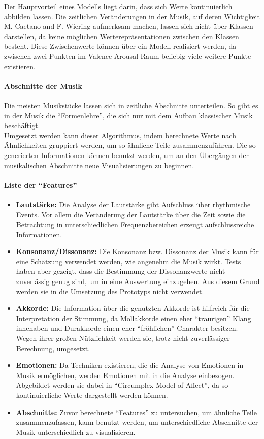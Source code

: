 \documentclass[11pt,a4paper]{article}
\begin{document}
Der Hauptvorteil eines Modells liegt darin, dass sich Werte kontinuierlich abbilden lassen. Die zeitlichen Veränderungen in der Musik, auf deren Wichtigkeit M. Caetano and F. Wiering
 \cite{8a02f9c512933d46fbea928d23ac65e38b61b88caba9b38319a5d4952b5a6667} aufmerksam machen, lassen sich nicht über Klassen darstellen, da keine möglichen Werterepräsentationen zwischen den Klassen besteht. Diese Zwischenwerte können über ein Modell realisiert werden, da zwischen zwei Punkten im Valence-Arousal-Raum beliebig viele weitere Punkte existieren.
 
\paragraph{Abschnitte der Musik}
Die meisten Musikstücke lassen sich in zeitliche Abschnitte unterteilen. So gibt es in der Musik die ``Formenlehre'', die sich nur mit dem Aufbau klassischer Musik beschäftigt.\\
Umgesetzt werden kann dieser Algorithmus, indem berechnete Werte nach Ähnlichkeiten gruppiert werden, um so ähnliche Teile zusammenzuführen. Die so generierten Informationen können benutzt werden, um an den Übergängen der musikalischen Abschnitte neue Visualisierungen zu beginnen.
 
\paragraph{Liste der ``Features''}
\begin{itemize}
\item \textbf{Lautstärke:}
Die Analyse der Lautstärke gibt Aufschluss über rhythmische Events. Vor allem die Veränderung der Lautstärke über die Zeit sowie die Betrachtung in unterschiedlichen Frequenzbereichen erzeugt aufschlussreiche Informationen.
\item \textbf{Konsonanz/Dissonanz:}
Die Konsonanz bzw. Dissonanz der Musik kann für eine Schätzung verwendet werden, wie angenehm die Musik wirkt. Tests haben aber gezeigt, dass die Bestimmung der Dissonanzwerte nicht zuverlässig genug sind, um in eine Auswertung einzugehen. Aus diesem Grund werden sie in die Umsetzung des Prototyps nicht verwendet.
\item \textbf{Akkorde:}
Die Information über die genutzten Akkorde ist hilfreich für die Interpretation der Stimmung, da Mollakkorde einen eher ``traurigen'' Klang innehaben und Durakkorde einen eher ``fröhlichen'' Charakter besitzen. Wegen ihrer großen Nützlichkeit werden sie, trotz nicht zuverlässiger Berechnung, umgesetzt.
\item \textbf{Emotionen:}
Da Techniken existieren, die die Analyse von Emotionen in Musik ermöglichen, werden Emotionen mit in die Analyse einbezogen. Abgebildet werden sie dabei in ``Circumplex Model of Affect'', da so kontinuierliche Werte dargestellt werden können.
\item \textbf{Abschnitte:}
Zuvor berechnete ``Features'' zu untersuchen, um ähnliche Teile zusammenzufassen, kann benutzt werden, um unterschiedliche Abschnitte der Musik unterschiedlich zu visualisieren.
\end{itemize}
\end{document}
